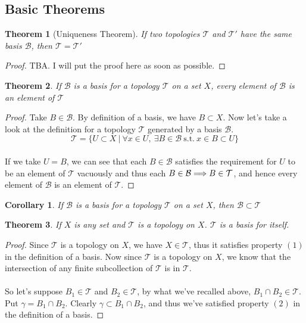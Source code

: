\documentclass{article}
\newtheorem{theorem}{Theorem}[section]
\newtheorem{corollary}{Corollary}[theorem]
\theoremstyle{remark}
\theoremstyle{definition}
\newcommand{\simplies}{\DOTSB\Longrightarrow}
\begin{document}
\hrulefill

\subsection{Basic Theorems}

\medskip

\begin{theorem}[Uniqueness Theorem]
If two topologies $\mathcal{T}$ and $\mathcal{T'}$ have the same basis $\mathcal{B}$, then $\mathcal{T} = \mathcal{T'}$
\end{theorem}

\begin{proof}
TBA. I will put the proof here as soon as possible.
\end{proof}

\medskip

\begin{theorem}
If $\mathcal{B}$ is a basis for a topology $\mathcal{T}$ on a set $X$, every element of $\mathcal{B}$ is an element of $\mathcal{T}$
\end{theorem}

\begin{proof}
Take $B \in \mathcal{B}$. By definition of a basis, we have $B \subset X$. Now let's take a look at the definition for a topology $\mathcal{T}$ generated by a basis $\mathcal{B}$. $$\mathcal{T} = \{ U \subset X \ | \ \forall x \in U, \ \exists B \in \mathcal{B} \ \text{s.t.} \ x \in B \subset U\}$$
\\ 
If we take $U = B$, we can see that each $B \in \mathcal{B}$ satisfies the requirement for $U$ to be an element of $\mathcal{T}$ vacuously and thus each $B \in \mathcal{B} \simplies B \in \mathcal{T}$, and hence every element of $\mathcal{B}$ is an element of $\mathcal{T}$.
\end{proof}



\begin{corollary}
If $\mathcal{B}$ is a basis for a topology $\mathcal{T}$ on a set $X$, then $\mathcal{B} \subset \mathcal{T}$
\end{corollary}

\newpage

\begin{theorem}
If $X$ is any set and $\mathcal{T}$ is a topology on $X$. $\mathcal{T}$ is a basis for itself.
\end{theorem}

\begin{proof}
Since $\mathcal{T}$ is a topology on $X$, we have $X \in \mathcal{T}$, thus it satisfies property $(1)$ in the definition of a basis. Now since $\mathcal{T}$ is a topology on $X$, we know that the intersection of any finite subcollection of $\mathcal{T}$ is in $\mathcal{T}$.
\\ \\
So let's suppose $B_1 \in \mathcal{T}$ and $B_2 \in \mathcal{T}$, by what we've recalled above, $B_1 \cap B_2 \in \mathcal{T}$. Put $\gamma = B_1 \cap B_2$. Clearly $\gamma \subset B_1 \cap B_2$, and thus we've satisfied property $(2)$ in the definition of a basis. 
\end{proof}
\end{document}
